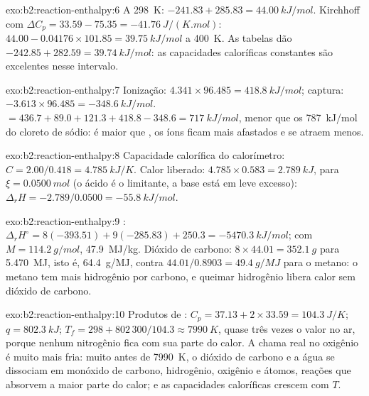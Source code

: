 \begin{solution}{exo:b2:reaction-enthalpy:6}
A \qty{298}{K}: $-241.83 + 285.83 = \qty{44.00}{kJ/mol}$. Kirchhoff com
$\Delta C_p = 33.59 - 75.35 = \qty{-41.76}{J/(K.mol)}$:
$44.00 - 0.04176 \times 101.85 = \qty{39.75}{kJ/mol}$ a \qty{400}{K}. As
tabelas dão $-242.85 + 282.59 = \qty{39.74}{kJ/mol}$: as capacidades
caloríficas constantes são excelentes nesse intervalo.
\end{solution}

\begin{solution}{exo:b2:reaction-enthalpy:7}
Ionização: $4.341 \times 96.485 = \qty{418.8}{kJ/mol}$; captura:
$-3.613 \times 96.485 = \qty{-348.6}{kJ/mol}$.  $= 436.7 +
89.0 + 121.3 + 418.8 - 348.6 = \qty{717}{kJ/mol}$, menor que os
\qty{787}{kJ/mol} do cloreto de sódio:  é maior que , os
íons ficam mais afastados e se atraem menos.
\end{solution}

\begin{solution}{exo:b2:reaction-enthalpy:8}
Capacidade calorífica do calorímetro: $C = 2.00/0.418 = \qty{4.785}{kJ/K}$.
Calor liberado: $4.785 \times 0.583 = \qty{2.789}{kJ}$, para $\xi =
\qty{0.0500}{mol}$ (o ácido é o limitante, a base está em leve excesso):
$\Delta_r H = -2.789/0.0500 = \qty{-55.8}{kJ/mol}$.
\end{solution}

\begin{solution}{exo:b2:reaction-enthalpy:9}
: $\Delta_r H^\circ =
8(-393.51) + 9(-285.83) + 250.3 = \qty{-5470.3}{kJ/mol}$; com $M =
\qty{114.2}{g/mol}$, \qty{47.9}{MJ/kg}. Dióxido de carbono: $8 \times 44.01 =
\qty{352.1}{g}$ para \qty{5.470}{MJ}, isto é, \qty{64.4}{g/MJ}, contra
$44.01/0.8903 = \qty{49.4}{g/MJ}$ para o metano: o metano tem mais hidrogênio
por carbono, e queimar hidrogênio libera calor sem dióxido de carbono.
\end{solution}

\begin{solution}{exo:b2:reaction-enthalpy:10}
Produtos de : $C_p = 37.13 + 2 \times 33.59 =
\qty{104.3}{J/K}$; $q = \qty{802.3}{kJ}$; $T_f = 298 + 802\,300/104.3 \approx
\qty{7990}{K}$, quase três vezes o valor no ar, porque nenhum nitrogênio
fica com sua parte do calor. A chama real no oxigênio é muito mais fria:
muito antes de \qty{7990}{K}, o dióxido de carbono e a água
se dissociam em monóxido de carbono, hidrogênio, oxigênio e átomos, reações
 que absorvem a maior parte do calor; e as capacidades
caloríficas crescem com $T$.
\end{solution}

